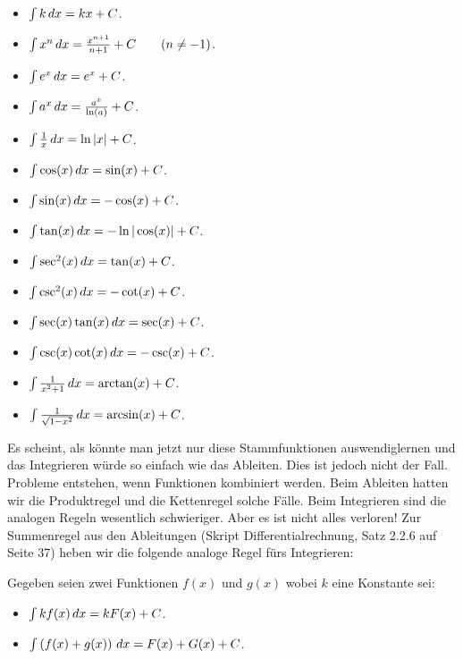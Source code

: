 \begin{fullwidth}
\begin{mainTheorem}\label{theorem:basicAnti} \hfil
\begin{multicols}{3}
\begin{itemize}
\item $\int k \, d x= kx+C$.
\item $\int x^n \, d x= \frac{x^{n+1}}{n+1}+C\qquad(n\ne-1)$.
\item $\int e^x \, d x= e^x + C$.
\item $\int a^x \, d x= \frac{a^x}{\ln(a)}+C$.
\item $\int \frac{1}{x} \, d x= \ln|x|+C$.
\item $\int \cos(x) \, d x = \sin(x) + C$.
\item $\int \sin(x) \, d x = -\cos(x) + C$.  
\item $\int \tan(x) \, d x = -\ln|\cos(x)| + C$.  
\item $\int \sec^2(x) \, d x = \tan(x) + C$. 
\item $\int \csc^2(x) \, d x = -\cot(x) + C$.
\item $\int \sec(x)\tan(x) \, d x = \sec(x) + C$.
\item $\int \csc(x)\cot(x) \, d x = -\csc(x) + C$.
\item $\int \frac{1}{x^2+1}\, d x = \arctan(x) + C$.
\item $\int \frac{1}{\sqrt{1-x^2}}\, d x= \arcsin(x)+C$.
\end{itemize}
\end{multicols}
\end{mainTheorem}
\end{fullwidth}
Es scheint, als könnte man jetzt nur diese Stammfunktionen auswendiglernen und das Integrieren würde so einfach wie das Ableiten. Dies ist jedoch nicht der Fall. Probleme entstehen, wenn Funktionen kombiniert werden. Beim Ableiten hatten wir die Produktregel und die Kettenregel solche Fälle. Beim Integrieren sind die analogen Regeln wesentlich schwieriger. Aber es ist nicht alles verloren! Zur Summenregel aus den Ableitungen (Skript Differentialrechnung, Satz 2.2.6 auf Seite 37) heben wir die folgende analoge Regel fürs Integrieren:


\begin{mainTheorem}\label{theorem:SRA}
Gegeben seien zwei Funktionen $f(x)$ und $g(x)$ wobei $k$ eine Konstante sei:
\begin{itemize}
\item $\int k f(x) \, d x= kF(x) + C$.
\item $\int \left(f(x) + g(x)\right) \, d x = F(x) + G(x) + C$.
\end{itemize}
\end{mainTheorem}

